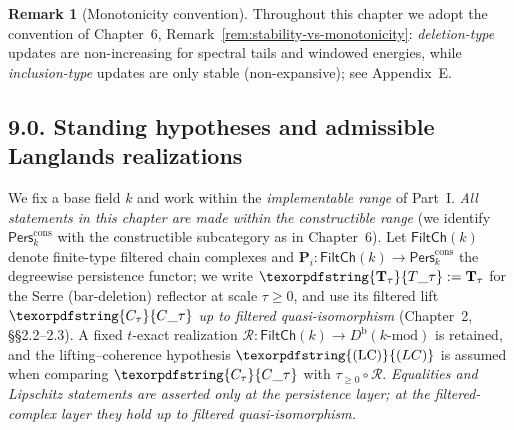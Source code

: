 \documentclass[11pt]{article}
\numberwithin{equation}{section}
\theoremstyle{plain}
\theoremstyle{definition}
\theoremstyle{remark}
\DeclareRobustCommand{\hyp}{\nobreakdash-}
\newcommand{\Pers}{\mathsf{Pers}}
\newcommand{\Rfun}{\mathcal{R}}
\theoremstyle{plain}
\theoremstyle{definition}
\numberwithin{equation}{section}
\theoremstyle{definition}
\newtheorem{remark}[theorem]{Remark}
\DeclareRobustCommand{\FiltCh}[1]{\mathsf{FiltCh}(#1)}
\DeclareRobustCommand{\Perskft}{\Pers^{\mathrm{cons}}_{k}}
\DeclareRobustCommand{\Ttau}{\texorpdfstring{\ensuremath{\mathbf{T}_{\tau}}}{T\_\tau}}
\DeclareRobustCommand{\Ctau}{\texorpdfstring{\ensuremath{C_{\tau}}}{C\_\tau}}
\DeclareRobustCommand{\LC}{\texorpdfstring{\ensuremath{\mathrm{(LC)}}}{(LC)}}
\numberwithin{equation}{section}
\theoremstyle{plain}
\theoremstyle{definition}
\theoremstyle{remark}
\providecommand{\Cfun}[1]{\mathsf{C}_{#1}}
\providecommand{\Tfun}[1]{\mathbf{T}_{#1}}
\providecommand{\Ctau}{\Cfun{\tau}}
\providecommand{\Ttau}{\Tfun{\tau}}
\begin{document}
\begin{remark}[Monotonicity convention]
Throughout this chapter we adopt the convention of
Chapter~6, Remark~\ref{rem:stability-vs-monotonicity}:
\emph{deletion\hyp type} updates are non\hyp increasing for spectral tails and windowed energies,
while \emph{inclusion\hyp type} updates are only stable (non\hyp expansive); see Appendix~E.
\end{remark}

\subsection*{9.0. Standing hypotheses and admissible Langlands realizations}
We fix a base field \(k\) and work within the \emph{implementable range} of Part~I.
\emph{All statements in this chapter are made within the constructible range}
(we identify \(\Perskft\) with the constructible subcategory as in Chapter~6).
Let \(\FiltCh{k}\) denote finite\hyp type filtered chain complexes and
\(\mathbf{P}_i:\FiltCh{k}\to\Perskft\) the degreewise persistence functor; we write
\(\Ttau:=\mathbf{T}_\tau\) for the Serre (bar\hyp deletion) reflector at scale \(\tau\ge 0\),
and use its filtered lift \(\Ctau\) \emph{up to filtered quasi\hyp isomorphism} (Chapter~2, §§2.2–2.3).
A fixed \(t\)\hyp exact realization \(\Rfun:\FiltCh{k}\to D^{\mathrm{b}}(k\text{-mod})\) is retained, and the lifting–coherence hypothesis \(\LC\) is assumed when comparing \(\Ctau\) with \(\tau_{\ge 0}\!\circ\!\Rfun\).
\emph{Equalities and Lipschitz statements are asserted only at the persistence layer; at the filtered\hyp complex layer they hold up to filtered quasi\hyp isomorphism.}
\end{document}

